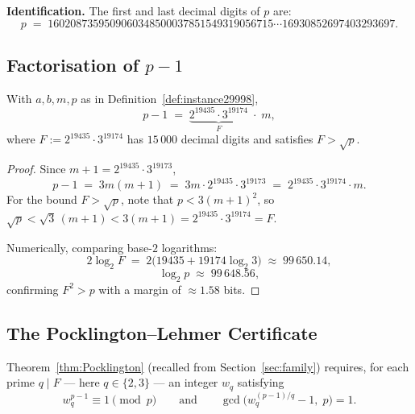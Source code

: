 \medskip

\noindent\textbf{Identification.}\quad
The first and last decimal digits of $p$ are:
\begin{equation}\label{eq:p29998digits}
  p \;=\; 1602087359509060348500037851549319056715\cdots
         16930852697403293697.
\end{equation}

\subsection{Factorisation of $p-1$}

\begin{rigorousbox}
\begin{lemma}[Factorisation of $p-1$]\label{lem:factorisation29998}
With $a, b, m, p$ as in Definition~\ref{def:instance29998},
\[
  p - 1 \;=\; \underbrace{2^{19435}\cdot 3^{19174}}_{F}
              \;\cdot\; m,
\]
where $F := 2^{19435}\cdot 3^{19174}$ has $15\,000$ decimal digits and
satisfies $F > \sqrt{p}$.
\end{lemma}
\end{rigorousbox}

\begin{proof}
Since $m + 1 = 2^{19435}\cdot 3^{19173}$,
\[
  p - 1 \;=\; 3m(m+1) \;=\; 3m\cdot 2^{19435}\cdot 3^{19173}
           \;=\; 2^{19435}\cdot 3^{19174}\cdot m.
\]
For the bound $F > \sqrt{p}$, note that $p < 3(m+1)^2$, so
$\sqrt{p} < \sqrt{3}\,(m+1) < 3(m+1) = 2^{19435}\cdot 3^{19174} = F$.

\noindent Numerically, comparing base-$2$ logarithms:
\[
  2\log_2 F
  \;=\; 2\bigl(19435 + 19174\log_2 3\bigr)
  \;\approx\; 99\,650.14,
\]
\[
  \log_2 p \;\approx\; 99\,648.56,
\]
confirming $F^2 > p$ with a margin of $\approx 1.58$ bits.
\end{proof}

\subsection{The Pocklington--Lehmer Certificate}

Theorem~\ref{thm:Pocklington} (recalled from Section~\ref{sec:family})
requires, for each prime $q \mid F$ — here $q \in \{2, 3\}$ — an integer
$w_q$ satisfying
\[
  w_q^{p-1} \equiv 1 \pmod{p}
  \qquad\text{and}\qquad
  \gcd\!\bigl(w_q^{(p-1)/q} - 1,\; p\bigr) = 1.
\]

